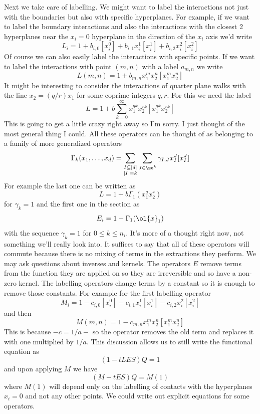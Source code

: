Next we take care of labelling. We might want to label the interactions not just with the boundaries but also with specific hyperplanes. For example, if we want to label the boundary interactions and also the interactions with the closest 2 hyperplanes near the $x_i = 0$ hyperplane in the direction of the $x_i$ axis we'd write
\[
    L_i = 1+ b_{i,0}[x_i^0]+ b_{i,1}x_i^1[x_i^1]+ b_{i,2}x_i^2[x_i^2]
\]
Of course we can also easily label the interactions with specific points. If we want to label the interactions with point $(m,n)$ with a label $a_{m,n}$ we write
\[
	L(m,n)= 1 + b_{m,n}x_1^m x_2^n[x_1^m x_2^n]
\]
It might be interesting to consider the interactions of quarter plane walks with the line $x_2 = (q/r)x_1$ for some coprime integers $q, r$. For this we need the label
\[
   L = 1 + b\sum_{k=0}^{\infty}x_1^{qk}x_2^{rk}[x_1^{qk} x_2^{rk}]
\]
This is going to get a little crazy right away so I'm sorry. I just thought of the most general thing I could. All these operators can be thought of as belonging to a family of more generalized operators
\[
    \Gamma_k(x_1,\ldots,x_d) = \sum_{\substack{I\subseteq [d]\\ |I| = k}}\sum_{J \in \ze^k} \gamma_{I,J} x_I^J[x_I^J]
\]
For example the last one can be written as
\[
    L = 1 + b \Gamma_1(x_1^qx_2^r)
\]
for $\gamma_k = 1$ and the first one in the section as
\[
  E_i = 1 - \Gamma_1(\ol{x}_1)
\]
with the sequence $\gamma_k = 1$ for $0\leq k \leq n_i$. It's more of a thought right now, not something we'll really look into. It suffices to say that all of these operators will commute because there is no mixing of terms in the extractions they perform. We may ask questions about inverses and kernels. The operators $E$ remove terms from the function they are applied on so they are irreversible and so have a non-zero kernel. The labelling operators change terms by a constant so it is enough to remove those constants. For example for the first labelling operator
\[
	M_i = 1- c_{i,0}[x_i^0]- c_{i,1}x_i^1[x_i^1]- c_{i,2}x_i^2[x_i^2]
\]
and then
\[
	M(m,n)= 1 - c_{m,n}x_1^m x_2^n[x_1^m x_2^n]
\]
This is because $-c = 1/a - $ so the operator removes the old term and replaces it with one multiplied by $1/a$. This discussion allows us to still write the functional equation as
\[
	(1- tLES)Q = 1
\]
and upon applying $M$ we have
\[
	(M - tES)Q = M(1)
\]
where $M(1)$ will depend only on the labelling of contacts with the hyperplanes $x_i = 0$ and not any other points. We could write out explicit equations for some operators.

